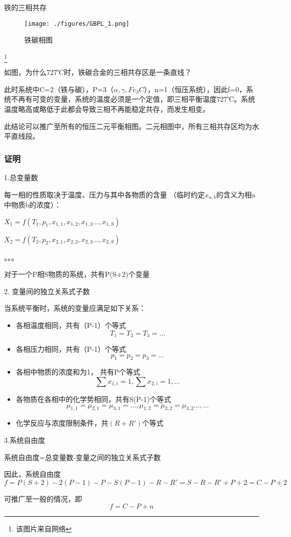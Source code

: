 \begin{example}{铁的三相共存}
\begin{figure}[ht]
\centering
\texttt{[image: ./figures/GBPL\_1.png]}
\caption{铁碳相图} \label{GBPL_fig1}
\end{figure}
\footnote{该图片来自网络}

如图，为什么727℃时，铁碳合金的三相共存区是一条直线？

此时系统中C=2（铁与碳），P=3（$\alpha, \gamma, Fe_3C$），n=1（恒压系统），因此f=0，系统不再有可变的变量，系统的温度必须是一个定值，即三相平衡温度727℃。系统温度略高或略低于此都会导致三相不再能稳定共存，而发生相变。

此结论可以推广至所有的恒压二元平衡相图。二元相图中，所有三相共存区均为水平直线段。
\end{example}

\subsubsection{证明}
1.总变量数

每一相的性质取决于温度、压力与其中各物质的含量 （临时约定$x_{a,b}$的含义为相a中物质b的浓度）：

$X_1=f(T_1, p_1,x_{1,1},x_{1,2},x_{1,3}...,x_{1,S})$

$X_2=f(T_2,p_2,x_{2,1},x_{2,2},x_{2,3}...,x_{2,S})$

。。。

对于一个P相S物质的系统，共有P(S+2)个变量

2. 变量间的独立关系式子数

当系统平衡时，系统的变量应满足如下关系：

\begin{itemize}
\item 各相温度相同，共有（P-1）个等式
\begin{equation}
T_1=T_2=T_3=...
\end{equation}
\item 各相压力相同，共有（P-1）个等式
\begin{equation}
p_1=p_2=p_3=...
\end{equation}
\item 各相中物质的浓度和为1， 共有P个等式
\begin{equation}
\sum x_{1,i} = 1, \sum x_{2,i} = 1, ...
\end{equation}
\item 各物质在各相中的化学势相同，共有S(P-1)个等式
\begin{equation}
\mu_{1,1}=\mu_{2,1}=\mu_{3,1}=..., \mu_{1,2}=\mu_{2,2}=\mu_{3,2}..., ...
\end{equation}
\item 化学反应与浓度限制条件，共$(R+R')$个等式
\end{itemize}

3.系统自由度

系统自由度=总变量数-变量之间的独立关系式子数

因此，系统自由度 
\begin{equation}
f = P(S+2) - 2(P-1) - P - S(P-1)-R-R'=S-R-R'+P+2=C-P+2
\end{equation}

可推广至一般的情况，即
\begin{equation}
f = C-P+n
\end{equation}
